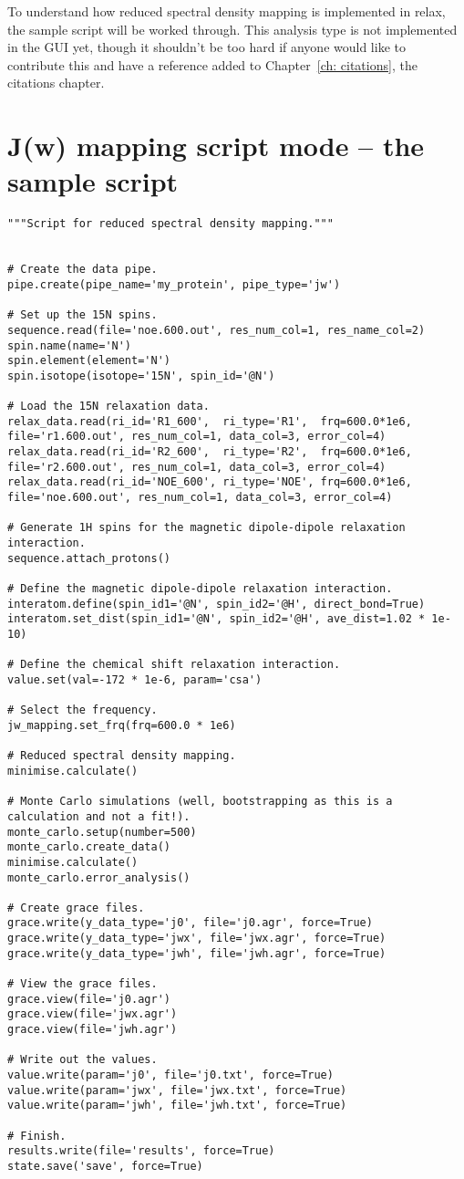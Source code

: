 To understand how reduced spectral density mapping is implemented in relax, the sample script will be worked through.
This analysis type is not implemented in the GUI yet, though it shouldn't be too hard if anyone would like to contribute this and have a reference added to Chapter~\ref{ch: citations}, the citations chapter.



\section{J(w) mapping script mode -- the sample script}

\begin{lstlisting}
"""Script for reduced spectral density mapping."""


# Create the data pipe.
pipe.create(pipe_name='my_protein', pipe_type='jw')

# Set up the 15N spins.
sequence.read(file='noe.600.out', res_num_col=1, res_name_col=2)
spin.name(name='N')
spin.element(element='N')
spin.isotope(isotope='15N', spin_id='@N')

# Load the 15N relaxation data.
relax_data.read(ri_id='R1_600',  ri_type='R1',  frq=600.0*1e6, file='r1.600.out', res_num_col=1, data_col=3, error_col=4)
relax_data.read(ri_id='R2_600',  ri_type='R2',  frq=600.0*1e6, file='r2.600.out', res_num_col=1, data_col=3, error_col=4)
relax_data.read(ri_id='NOE_600', ri_type='NOE', frq=600.0*1e6, file='noe.600.out', res_num_col=1, data_col=3, error_col=4)

# Generate 1H spins for the magnetic dipole-dipole relaxation interaction.
sequence.attach_protons()

# Define the magnetic dipole-dipole relaxation interaction.
interatom.define(spin_id1='@N', spin_id2='@H', direct_bond=True)
interatom.set_dist(spin_id1='@N', spin_id2='@H', ave_dist=1.02 * 1e-10)

# Define the chemical shift relaxation interaction.
value.set(val=-172 * 1e-6, param='csa')

# Select the frequency.
jw_mapping.set_frq(frq=600.0 * 1e6)

# Reduced spectral density mapping.
minimise.calculate()

# Monte Carlo simulations (well, bootstrapping as this is a calculation and not a fit!).
monte_carlo.setup(number=500)
monte_carlo.create_data()
minimise.calculate()
monte_carlo.error_analysis()

# Create grace files.
grace.write(y_data_type='j0', file='j0.agr', force=True)
grace.write(y_data_type='jwx', file='jwx.agr', force=True)
grace.write(y_data_type='jwh', file='jwh.agr', force=True)

# View the grace files.
grace.view(file='j0.agr')
grace.view(file='jwx.agr')
grace.view(file='jwh.agr')

# Write out the values.
value.write(param='j0', file='j0.txt', force=True)
value.write(param='jwx', file='jwx.txt', force=True)
value.write(param='jwh', file='jwh.txt', force=True)

# Finish.
results.write(file='results', force=True)
state.save('save', force=True)
\end{lstlisting}
